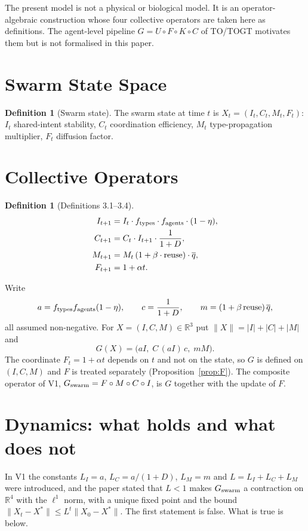 \documentclass[11pt]{article}
\theoremstyle{definition}
\newtheorem{definition}[theorem]{Definition}
\theoremstyle{remark}
\newcommand{\R}{\mathbb{R}}
\newcommand{\nrm}[1]{\lVert #1\rVert}
\begin{document}
The present model is not a physical or biological model. It is an operator-algebraic construction whose four
collective operators are taken here as definitions. The agent-level pipeline $G=U\circ F\circ K\circ C$ of
TO/TOGT motivates them but is not formalised in this paper.

\section{Swarm State Space}
\begin{definition}[Swarm state]
The swarm state at time $t$ is $X_t=(I_t,C_t,M_t,F_t)$: $I_t$ shared-intent stability, $C_t$ coordination
efficiency, $M_t$ type-propagation multiplier, $F_t$ diffusion factor.
\end{definition}

\section{Collective Operators}
\begin{definition}[Definitions 3.1--3.4]\label{def:ops}
\begin{align*}
I_{t+1} &= I_t\cdot f_{\rm types}\cdot f_{\rm agents}\cdot(1-\eta),\\
C_{t+1} &= C_t\cdot I_{t+1}\cdot \frac{1}{1+D},\\
M_{t+1} &= M_t\,(1+\beta\cdot{\rm reuse})\cdot \overline{q},\\
F_{t+1} &= 1+\alpha t.
\end{align*}
\end{definition}
Write
\[
a=f_{\rm types}f_{\rm agents}(1-\eta),\qquad c=\frac1{1+D},\qquad m=(1+\beta\,{\rm reuse})\,\overline q,
\]
all assumed non-negative. For $X=(I,C,M)\in\R^3$ put $\nrm X=|I|+|C|+|M|$ and
\[
G(X)=\bigl(aI,\; C\,(aI)\,c,\; mM\bigr).
\]
The coordinate $F_t=1+\alpha t$ depends on $t$ and not on the state, so $G$ is defined on $(I,C,M)$ and
$F$ is treated separately (Proposition~\ref{prop:F}). The composite operator of V1,
$G_{\rm swarm}=F\circ M\circ C\circ I$, is $G$ together with the update of $F$.

\section{Dynamics: what holds and what does not}
In V1 the constants $L_I=a$, $L_C=a/(1+D)$, $L_M=m$ and $L=L_I+L_C+L_M$ were introduced, and the paper stated
that $L<1$ makes $G_{\rm swarm}$ a contraction on $\R^4$ with the $\ell^1$ norm, with a unique fixed point and
the bound $\nrm{X_t-X^*}\le L^t\nrm{X_0-X^*}$. The first statement is false. What is true is below.
\end{document}
